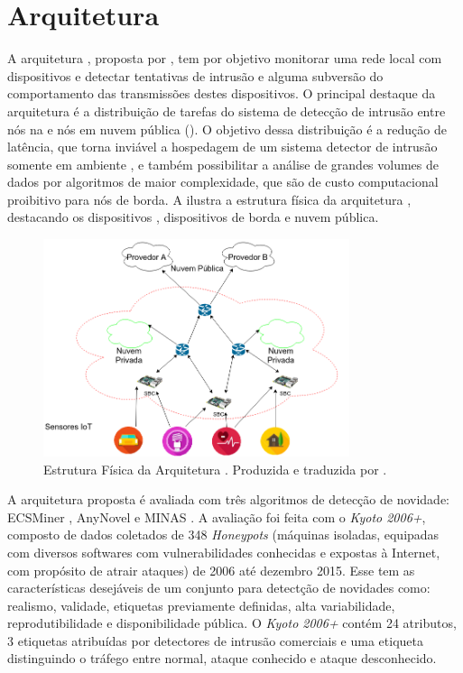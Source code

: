 \section{Arquitetura \idsiot}\label{sec:cassales}

A arquitetura \idsiot, proposta por , tem por objetivo
monitorar uma rede local com dispositivos \iot e detectar tentativas de intrusão
e alguma subversão do comportamento das transmissões destes dispositivos.
O principal destaque da arquitetura é a distribuição de tarefas do sistema de
detecção de intrusão entre nós na  e nós em nuvem pública
(\cloud).
O objetivo dessa distribuição é a redução de latência, que torna inviável a
hospedagem de um sistema detector de intrusão somente em ambiente \cloud, e
também possibilitar a análise de grandes volumes de dados por algoritmos de
maior complexidade, que são de custo computacional proibitivo para nós de borda.
A  ilustra a estrutura física da arquitetura \idsiot,
destacando os dispositivos \iot, dispositivos de borda e nuvem pública.

\begin{figure}[ht]
\centering
\includegraphics[width=0.8\textwidth]{figuras/idsa-iot-quali-000.png}
\caption{Estrutura Física da Arquitetura \idsiot.
Produzida e traduzida por .}
\label{fig:ids-iot-phy}
\end{figure}

A arquitetura proposta é avaliada com três algoritmos de detecção de novidade:
ECSMiner \cite{Masud2010ECSMiner}, AnyNovel \cite{Abdallah2016anynovel} e MINAS
\cite{Faria2016minas}.
A avaliação foi feita com o \dataset \emph{Kyoto 2006+}, composto de
dados coletados de 348 \emph{Honeypots} 
(máquinas isoladas, equipadas com diversos
softwares com vulnerabilidades conhecidas e expostas à Internet, com propósito de
atrair ataques) de 2006 até dezembro 2015.
Esse \dataset tem as características desejáveis de um conjunto para detectção de
novidades como: realismo, validade, etiquetas previamente definidas, alta
variabilidade, reprodutibilidade e disponibilidade pública.
O \dataset \emph{Kyoto 2006+} contém 24 atributos, 3 etiquetas atribuídas por
detectores de intrusão comerciais e uma etiqueta
distinguindo o tráfego entre normal, ataque conhecido e ataque desconhecido.

